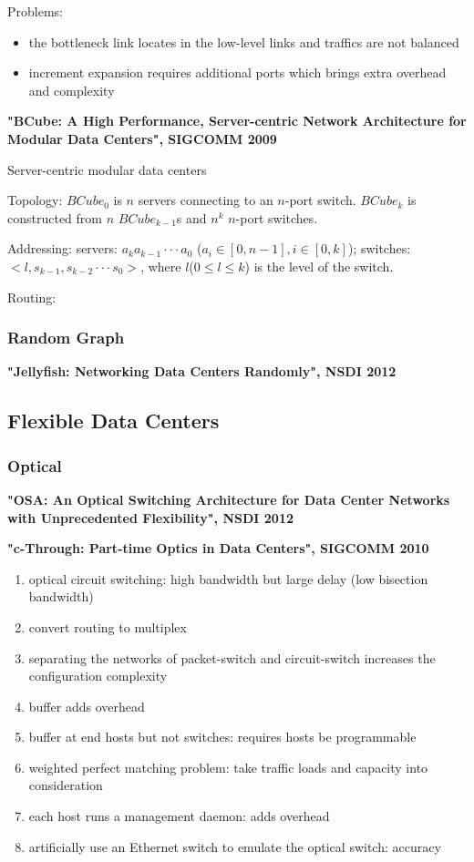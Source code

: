 \documentclass[journal,onecolumn,11pt]{IEEEtran}
\begin{document}
Problems:
\begin{itemize}
  \item the bottleneck link locates in the low-level links and traffics are not balanced
  \item increment expansion requires additional ports which brings extra overhead and complexity
\end{itemize}


\textbf{"BCube: A High Performance, Server-centric Network Architecture for Modular Data Centers", SIGCOMM 2009}

Server-centric modular data centers

Topology:
$BCube_0$ is $n$ servers connecting to an $n$-port switch. $BCube_k$ is constructed from $n$ $BCube_{k-1}$s and $n^k$ $n$-port switches.

Addressing:
servers: $a_ka_{k-1}\cdot\cdot\cdot a_0$ ($a_i\in [0,n-1],i\in [0,k]$); switches: $<l,s_{k-1},s_{k-2}\cdot\cdot\cdot s_0>$, where $l$($0\leq l\leq k$) is the level of the switch.

Routing:

\subsubsection{Random Graph}

\textbf{"Jellyfish: Networking Data Centers Randomly", NSDI 2012}

\subsection{Flexible Data Centers}

\subsubsection{Optical}

\textbf{"OSA: An Optical Switching Architecture for Data Center Networks with Unprecedented Flexibility", NSDI 2012}

\textbf{"c-Through: Part-time Optics in Data Centers", SIGCOMM 2010}

\begin{enumerate}
  \item optical circuit switching: high bandwidth but large delay (low bisection bandwidth)
  \item convert routing to multiplex
  \item separating the networks of packet-switch and circuit-switch increases the configuration complexity
  \item buffer adds overhead
  \item buffer at end hosts but not switches: requires hosts be programmable
  \item weighted perfect matching problem: take traffic loads and capacity into consideration
  \item each host runs a management daemon: adds overhead
  \item artificially use an Ethernet switch to emulate the optical switch: accuracy
\end{enumerate}
\end{document}
